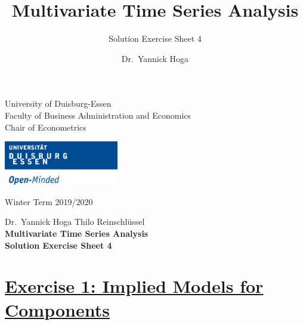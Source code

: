 \documentclass[12pt,a4paper]{article}
\title{Multivariate Time Series Analysis}
\subtitle{Solution Exercise Sheet 4}
\author{Dr.~Yannick Hoga}
\date{}
\newcommand{\tmpsection}[1]{}
\let\tmpsection=\section
\renewcommand{\section}[1]{\tmpsection{\underline{#1}} }
\begin{document}





\restoregeometry



\begin{minipage}{0.6\textwidth}
University of Duisburg-Essen\\
Faculty of Business Administration and Economics\\
Chair of Econometrics\\
\end{minipage}

	\begin{flushright}
	\vspace{-3cm}
	\includegraphics*[width=5cm]{../Includes/duelogo_en.png}\\
	\vspace{.125cm}
	\end{flushright}
\hspace{-0.005cm}Winter Term 2019/2020

\vspace{0.05cm}

\begin{center}
	\vspace{.25cm}
	Dr.~Yannick Hoga \hspace{.5cm} Thilo Reinschlüssel \\
	\vspace{.25cm}
	\textbf{\Large{Multivariate Time Series Analysis}}\\
	\vspace{.25cm}
	\textbf{\large{Solution Exercise Sheet 4}}\\
	\vspace{.125cm}
\end{center}





\hypertarget{exercise-1-implied-models-for-components}{%
\section{Exercise 1: Implied Models for
Components}\label{exercise-1-implied-models-for-components}}
\end{document}
